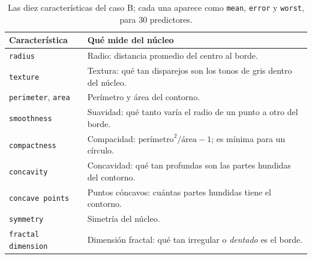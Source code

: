 \begin{table}[H]
\centering
\small
\begin{tabular}{l>{\raggedright\arraybackslash}p{11.5cm}}
\toprule
Característica & Qué mide del núcleo \\
\midrule
\texttt{radius} & Radio: distancia promedio del centro al borde. \\
\texttt{texture} & Textura: qué tan disparejos son los tonos de gris dentro
del núcleo. \\
\texttt{perimeter}, \texttt{area} & Perímetro y área del contorno. \\
\texttt{smoothness} & Suavidad: qué tanto varía el radio de un punto a otro
del borde. \\
\texttt{compactness} & Compacidad: $\text{perímetro}^2/\text{área}-1$; es
mínima para un círculo. \\
\texttt{concavity} & Concavidad: qué tan profundas son las partes hundidas
del contorno. \\
\texttt{concave points} & Puntos cóncavos: cuántas partes hundidas tiene el
contorno. \\
\texttt{symmetry} & Simetría del núcleo. \\
\texttt{fractal dimension} & Dimensión fractal: qué tan irregular o
\emph{dentado} es el borde. \\
\bottomrule
\end{tabular}
\caption{Las diez características del caso B; cada una aparece como
\texttt{mean}, \texttt{error} y \texttt{worst}, para $30$ predictores.}
\label{tab:vars-cancer}
\end{table}

